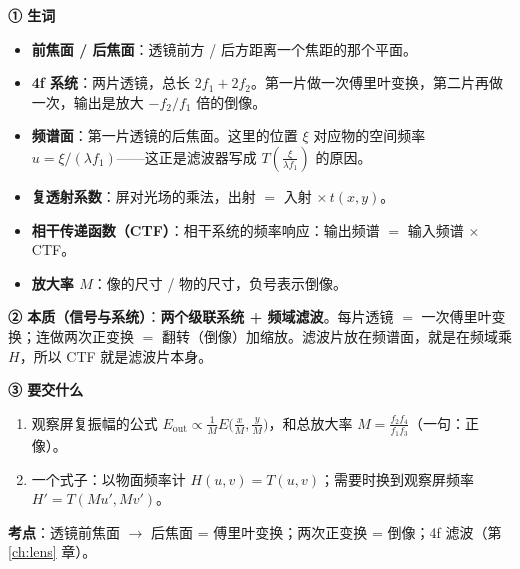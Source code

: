 \label{rd:v-4f2}
\begin{idea}[读题：概念与要交什么]
\textbf{① 生词}
\begin{itemize}
\item \textbf{前焦面 / 后焦面}：透镜前方 / 后方距离一个焦距的那个平面。
\item \textbf{4f 系统}：两片透镜，总长 $2f_1+2f_2$。第一片做一次傅里叶变换，第二片再做一次，输出是放大 $-f_2/f_1$ 倍的倒像。
\item \textbf{频谱面}：第一片透镜的后焦面。这里的位置 $\xi$ 对应物的空间频率 $u=\xi/(\lambda f_1)$——这正是滤波器写成 $T(\frac{\xi}{\lambda f_1})$ 的原因。
\item \textbf{复透射系数}：屏对光场的乘法，出射 $=$ 入射 $\times\,t(x,y)$。
\item \textbf{相干传递函数（CTF）}：相干系统的频率响应：输出频谱 $=$ 输入频谱 $\times$ CTF。
\item \textbf{放大率 $M$}：像的尺寸 / 物的尺寸，负号表示倒像。
\end{itemize}
\textbf{② 本质（信号与系统）}：\textbf{两个级联系统 + 频域滤波}。每片透镜 $=$ 一次傅里叶变换；连做两次正变换 $=$ 翻转（倒像）加缩放。滤波片放在频谱面，就是在频域乘 $H$，所以 CTF 就是滤波片本身。

\textbf{③ 要交什么}
\begin{enumerate}[label=\roman*.]
\item 观察屏复振幅的公式 $E_{\text{out}}\propto\frac1M E\big(\frac xM,\frac yM\big)$，和总放大率 $M=\frac{f_2f_4}{f_1f_3}$（一句：正像）。
\item 一个式子：以物面频率计 $H(u,v)=T(u,v)$；需要时换到观察屏频率 $H'=T(Mu',Mv')$。
\end{enumerate}
\end{idea}


\textbf{考点}：透镜前焦面 $\to$ 后焦面 = 傅里叶变换；两次正变换 = 倒像；4f 滤波（第 \ref{ch:lens} 章）。


